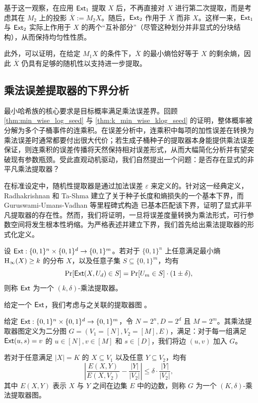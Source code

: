 基于这一观察，在应用 $\mathsf{Ext}_1$ 提取 $X$ 后，不再直接对 $X$ 进行第二次提取，而是考虑其在 $M_2$ 上的投影 $\overline{X} := M_2 X$。随后，$\mathsf{Ext}_2$ 作用于 $\overline{X}$ 而非 $X$。这样一来，$\mathsf{Ext}_1$ 与 $\mathsf{Ext}_2$ 实际上作用于 $X$ 的两个“互补部分”（尽管这种划分并非显式的分块结构），从而保持均匀性性质。

此外，可以证明，在给定 $M_1 X$ 的条件下，$\overline{X}$ 的最小熵恰好等于 $X$ 的剩余熵，因此 $\overline{X}$ 仍具有足够的随机性以支持进一步提取。

\subsection{乘法误差提取器的下界分析}\label{sec:lower_multi_ext}

最小哈希族的核心要求是目标概率满足乘法误差界。回顾 \cref{thm:min_wise_log_seed} 与 \cref{thm:k_min_wise_klog_seed} 的证明，整体概率被分解为多个子桶事件的连乘积。在误差分析中，连乘积中每项的加性误差在转换为乘法误差时通常都要付出很大代价；若生成子桶种子的提取器本身能提供乘法误差保证，则连乘积的误差传播将天然保持相对误差形式，从而大幅简化分析并有望突破现有参数瓶颈。受此直观动机驱动，我们自然提出一个问题：是否存在显式的非平凡乘法提取器？

在标准设定中，随机性提取器是通过加法误差 $\varepsilon$ 来定义的。针对这一经典定义，Radhakrishnan 和 Ta-Shma \cite{RT_siam00} 建立了关于种子长度和熵损失的一个基本下界，而 Guruswami-Umans-Vadhan 等里程碑式构造 \cite{GUV_extractor} 已基本匹配该下界，证明了显式非平凡提取器的存在性。然而，我们将证明，一旦将误差度量转换为乘法形式，可行参数空间将发生根本性坍缩。为严格表述并建立下界，我们首先给出乘法提取器的形式化定义。

\begin{definition}[乘法提取器]
    设 $\mathsf{Ext} : \{0,1\}^n \times \{0,1\}^d \to \{0,1\}^m$。若对于 $\{0,1\}^n$ 上任意满足最小熵 $\mathrm{H}_\infty(X)\ge k$ 的分布 $X$，以及任意子集 $S\subseteq\{0,1\}^m$，均有
    $$
    \Pr[\mathsf{Ext}(X, U_d) \in S] = \Pr[U_m \in S] \cdot (1 \pm \delta),
    $$
    则称 $\mathsf{Ext}$ 为一个 $(k,\delta)$-乘法提取器。
\end{definition}

给定一个 $\mathsf{Ext}$，我们考虑与之关联的提取器图 \cite{RT_siam00}。

\begin{definition}[乘法提取器图]
    给定 $\mathsf{Ext} : \{0, 1\}^n \times \{0, 1\}^d \to \{0, 1\}^m$，令 $N = 2^n, D = 2^d$ 且 $M = 2^m$。其乘法提取器图定义为二分图 $G = (V_1 = [N], V_2 = [M], E)$，满足：对于每一组满足 $\mathsf{Ext}(u, s) = v$ 的 $u \in [N], v \in [M]$ 和 $s \in [D]$，我们将边 $(u, v)$ 加入 $G$。
    
    若对于任意满足 $|X| = K$ 的 $X \subseteq V_1$ 以及任意 $Y \subseteq V_2$，均有
    $$
    \left| \frac{E(X,Y)}{E(X,V_2)}-\frac{|Y|}{|V_2|} \right| \le \delta \cdot \frac{|Y|}{|V_2|},
    $$
    其中 $E(X, Y)$ 表示 $X$ 与 $Y$ 之间在边集 $E$ 中的边数，则称 $G$ 为一个 $(K, \delta)$-乘法提取器图。
\end{definition}

